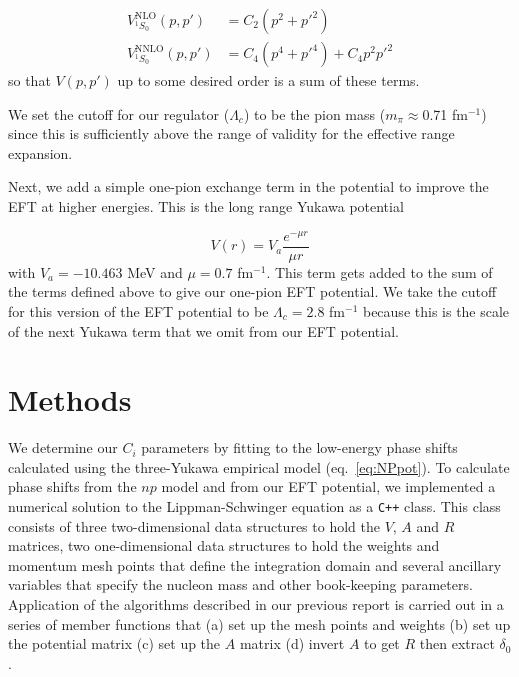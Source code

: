 \documentclass[10pt,showpacs,preprintnumbers,footinbib,amsmath,amssymb,aps,prl,twocolumn,groupedaddress,superscriptaddress,showkeys]{revtex4-1}
\begin{document}
\begin{align*}
V^\mathrm{NLO}_{^1S_0}(p,p') &= C_2(p^2 + p'^2)\\
V^\mathrm{NNLO}_{^1S_0}(p,p') &= C_4(p^4 + p'^4) + C_4 p^2p'^2
\end{align*}
so that $V(p,p')$ up to some desired order is a sum of these terms.



We set the cutoff for our regulator ($\Lambda_c$) to be the pion mass ($m _{\pi}
\approx $0.71 fm$^{-1}$) since this is sufficiently above the range of validity for
the effective range expansion.

Next, we add a simple one-pion exchange term in the potential to improve the
EFT at higher energies. This is the long range Yukawa potential

\begin{equation*}
	V(r)=V_a \frac{e^{-\mu r}}{\mu r}
	\label{eq:NP1}
\end{equation*}
with $V_a = -10.463$ MeV and $\mu = 0.7$ fm$^{-1}$. This term gets added to
the sum of the terms defined above to give our one-pion EFT potential. We take
the cutoff for this version of the EFT potential to be $\Lambda_c = 2.8$ fm$^{-1}$
because this is the scale of the next Yukawa term that we omit from our EFT potential.



\section{Methods}

We determine our $C_i$ parameters by fitting to the low-energy phase shifts calculated using the
three-Yukawa empirical model (eq.~\ref{eq:NPpot}).
To calculate phase shifts from the $np$ model and from our EFT potential, we implemented a numerical
solution to the Lippman-Schwinger equation as a \texttt{C++} class. This class consists of three
two-dimensional data structures to hold the $V$, $A$ and $R$ matrices, two one-dimensional data
structures to hold the weights and momentum mesh points that define the integration domain and
several ancillary variables that specify the nucleon mass and other book-keeping parameters.
Application of the algorithms described in our previous report is carried out in a series of member
functions that (a) set up the mesh points and weights (b) set up the potential matrix (c) set up the
$A$ matrix (d) invert $A$ to get $R$ then extract $\delta _0$. 
\end{document}
